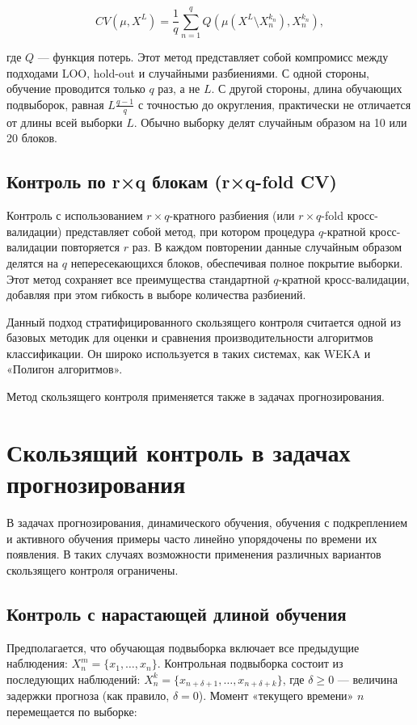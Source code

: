 \[
CV(\mu, X^L) = \frac{1}{q} \sum_{n=1}^q Q \left( \mu \left( X^L \setminus X^{k_n}_n \right), X^{k_n}_n \right),
\]

где \( Q \) — функция потерь. Этот метод представляет собой компромисс между подходами LOO, hold-out и случайными разбиениями. С одной стороны, обучение проводится только \( q \) раз, а не \( L \). С другой стороны, длина обучающих подвыборок, равная \( L \frac{q-1}{q} \) с точностью до округления, практически не отличается от длины всей выборки \( L \). Обычно выборку делят случайным образом на 10 или 20 блоков.

\subsection{Контроль по r×q блокам (r×q-fold CV)}
Контроль с использованием \(r \times q\)-кратного разбиения (или \(r \times q\)-fold кросс-валидации) представляет собой метод, при котором процедура \(q\)-кратной кросс-валидации повторяется \(r\) раз. В каждом повторении данные случайным образом делятся на \(q\) непересекающихся блоков, обеспечивая полное покрытие выборки. Этот метод сохраняет все преимущества стандартной \(q\)-кратной кросс-валидации, добавляя при этом гибкость в выборе количества разбиений.

Данный подход стратифицированного скользящего контроля считается одной из базовых методик для оценки и сравнения производительности алгоритмов классификации. Он широко используется в таких системах, как WEKA и «Полигон алгоритмов».

Метод скользящего контроля применяется также в задачах прогнозирования.


\section{Скользящий контроль в задачах прогнозирования}

В задачах прогнозирования, динамического обучения, обучения с подкреплением и активного обучения примеры часто линейно упорядочены по времени их появления. В таких случаях возможности применения различных вариантов скользящего контроля ограничены.

\subsection{Контроль с нарастающей длиной обучения}  Предполагается, что обучающая подвыборка включает все предыдущие наблюдения: \( X^m_n = \{x_1, \ldots, x_n\} \). Контрольная подвыборка состоит из последующих наблюдений: \( X^k_n = \{x_{n+\delta+1}, \ldots, x_{n+\delta+k}\} \), где \(\delta \geq 0\) — величина задержки прогноза (как правило, \(\delta = 0\)). Момент «текущего времени» \(n\) перемещается по выборке:

